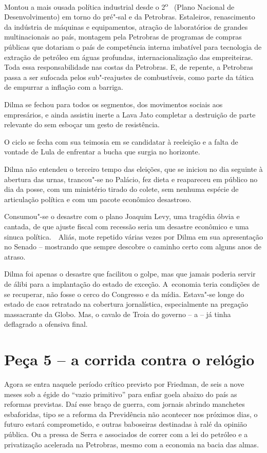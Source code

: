 Montou a mais ousada política industrial desde o
2\textsuperscript{o}~ (Plano Nacional de Desenvolvimento) em torno do
pré"-sal e da Petrobras. Estaleiros, renascimento da indústria de
máquinas e equipamentos, atração de laboratórios de grandes
multinacionais ao país, montagem pela Petrobras de programas de compras
públicas que dotariam o país de competência interna imbatível para
tecnologia de extração de petróleo em águas profundas,
internacionalização das empreiteiras. Toda essa responsabilidade nas
costas da Petrobras. E, de repente, a Petrobras passa a ser sufocada
pelos sub"-reajustes de combustíveis, como parte da tática de empurrar a
inflação com a barriga.

Dilma se fechou para todos os segmentos, dos movimentos sociais aos
empresários, e ainda assistiu inerte a Lava Jato completar a destruição
de parte relevante do  sem esboçar um gesto de resistência.

O ciclo se fecha com sua teimosia em se candidatar à reeleição e a falta
de vontade de Lula de enfrentar a bucha que surgia no horizonte.

Dilma não entendeu o terceiro tempo das eleições, que se iniciou no dia
seguinte à abertura das urnas, trancou"-se no Palácio, fez dieta e
reapareceu em público no dia da posse, com um ministério tirado do
colete, sem nenhuma espécie de articulação política e com um pacote
econômico desastroso.

Consumou"-se o desastre com o plano Joaquim Levy, uma tragédia óbvia e
cantada, de que ajuste fiscal com recessão seria um desastre econômico e
uma sinuca política.~~Aliás, mote repetido várias vezes por Dilma em sua
apresentação no Senado -- mostrando que sempre descobre o caminho certo
com alguns anos de atraso.

Dilma foi apenas o desastre que facilitou o golpe, mas que jamais
poderia servir de álibi para a implantação do estado de exceção. A~economia teria condições de se recuperar, não fosse o cerco do Congresso
e da mídia. Estava"-se longe do estado de caos retratado na cobertura
jornalística, especialmente na pregação massacrante da Globo. Mas, o
cavalo de Troia do governo -- a  -- já tinha deflagrado a ofensiva
final.

\section{Peça 5 -- a corrida contra o relógio}

Agora se entra naquele período crítico previsto por Friedman, de seis a
nove meses sob a égide do ``vazio primitivo'' para enfiar goela abaixo
do país as reformas previstas. Daí esse braço de guerra, com jornais
abrindo manchetes esbaforidas, tipo se a reforma da Previdência não
acontecer nos próximos dias, o futuro estará comprometido, e outras
baboseiras destinadas à ralé da opinião pública. Ou a pressa de Serra e
associados de correr com a lei do petróleo e a privatização acelerada na
Petrobras, mesmo com a economia na bacia das almas.


